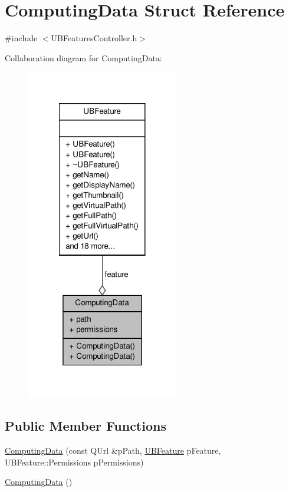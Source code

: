 \hypertarget{struct_computing_data}{\section{Computing\-Data Struct Reference}
\label{d8/dda/struct_computing_data}
}


{\ttfamily \#include $<$U\-B\-Features\-Controller.\-h$>$}



Collaboration diagram for Computing\-Data\-:
\nopagebreak
\begin{figure}[H]
\begin{center}
\leavevmode
\includegraphics[width=188pt]{db/d09/struct_computing_data__coll__graph}
\end{center}
\end{figure}
\subsection*{Public Member Functions}
\begin{DoxyCompactItemize}
\item 
\hyperlink{struct_computing_data_a54a3821960ab6e44499cd534b5a69c7e}{Computing\-Data} (const Q\-Url \&p\-Path, \hyperlink{class_u_b_feature}{U\-B\-Feature} p\-Feature, U\-B\-Feature\-::\-Permissions p\-Permissions)
\item 
\hyperlink{struct_computing_data_a18ddf6de7f04e5e3730974cf62cd1022}{Computing\-Data} ()
\end{DoxyCompactItemize}
